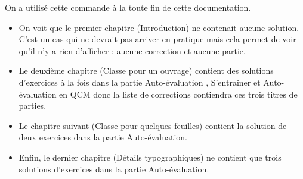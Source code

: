 \documentclass[nocrop]{sesamanuel}
\begin{document}
\begin{remarque}
On a utilisé cette commande à la toute fin de cette documentation. 
\begin{itemize}
 \item On
voit que le premier chapitre (Introduction) ne contenait aucune
solution. C'est un cas qui ne devrait pas arriver en pratique mais
cela permet de voir qu'il n'y a rien d'afficher : aucune correction et
aucune partie. 
\item Le deuxième chapitre (Classe pour un ouvrage) contient
des solutions d'exercices à la fois dans la partie \og Auto-évaluation
\fg{}, \og S'entraîner \fg{} et \og Auto-évaluation \fg{} en QCM donc
la liste de corrections contiendra ces trois titres de parties. 
\item Le
chapitre suivant (Classe pour quelques feuilles) contient la solution
de deux exercices dans la partie Auto-évaluation. 
\item Enfin, le dernier
chapitre (Détails typographiques) ne contient que trois solutions
d'exercices dans la partie Auto-évaluation.
\end{itemize}
\end{remarque}
\end{document}
